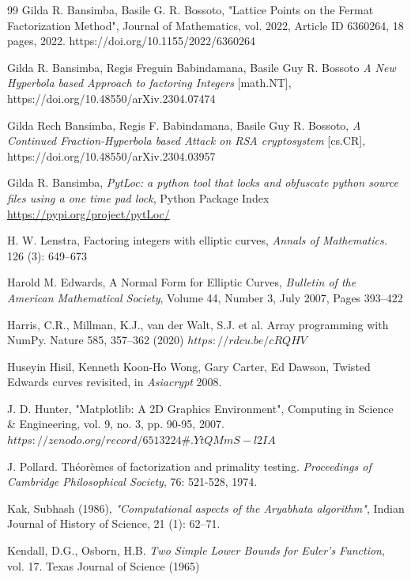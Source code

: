 \documentclass[sigconf,balance=false]{acmart}
\begin{document}
\begin{thebibliography}{99}
 Gilda R. Bansimba, Basile G. R. Bossoto, "Lattice Points on the Fermat Factorization Method", Journal of Mathematics, vol. 2022, Article ID 6360264, 18 pages, 2022. https://doi.org/10.1155/2022/6360264

 Gilda R. Bansimba, Regis Freguin Babindamana, Basile Guy R. Bossoto \emph{A New Hyperbola based Approach to factoring Integers} [math.NT], https://doi.org/10.48550/arXiv.2304.07474

 Gilda Rech Bansimba, Regis F. Babindamana, Basile Guy R. Bossoto, \emph{A Continued Fraction-Hyperbola based Attack on RSA cryptosystem} [cs.CR], 
https://doi.org/10.48550/arXiv.2304.03957


 Gilda R. Bansimba, \emph{PytLoc: a python tool that locks and obfuscate python source files using a one time pad lock}, Python Package Index \url{https://pypi.org/project/pytLoc/}

 H. W. Lenstra, Factoring integers with elliptic curves, \emph{Annals of Mathematics.} 126 (3): 649–673

 Harold M. Edwards, A Normal Form for Elliptic Curves, \emph{Bulletin of the American Mathematical Society}, Volume 44, Number 3, July 2007, Pages 393–422

 Harris, C.R., Millman, K.J., van der Walt, S.J. et al. Array programming with NumPy. Nature 585, 357–362 (2020) 
$https://rdcu.be/cRQHV$

 Huseyin Hisil, Kenneth Koon-Ho Wong, Gary Carter, Ed Dawson, Twisted Edwards curves revisited, in \emph{Asiacrypt} 2008.



 J. D. Hunter, "Matplotlib: A 2D Graphics Environment", Computing in Science \& Engineering, vol. 9, no. 3, pp. 90-95, 2007. $https://zenodo.org/record/6513224\#.YtQMmS-l2IA$

  J. Pollard. Théorèmes of factorization and primality testing. \emph{Proceedings of Cambridge Philosophical Society}, 76: 521-528, 1974.

 Kak, Subhash (1986), \emph{"Computational aspects of the Aryabhata algorithm"}, Indian Journal of History of Science, 21 (1): 62–71.

 Kendall, D.G., Osborn, H.B. \emph{Two Simple Lower Bounds for Euler’s Function}, vol. 17. Texas Journal of Science (1965)


\end{thebibliography}
\end{document}
